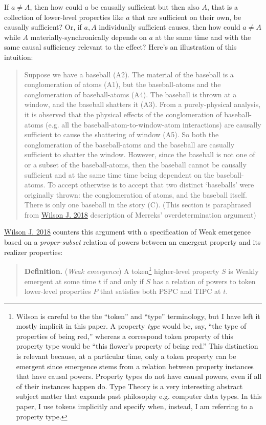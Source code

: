 \documentclass{article}
\newcommand{\ti}[1]{\textit{#1}}
\newcommand{\tb}[1]{\textbf{#1}}
\renewcommand{\cite}[1]{\hyperlink{#1}{#1}}
\begin{document}
If $a \neq A$, then how could $a$ be causally sufficient but then also $A$, that is a collection of lower-level properties like $a$ that are sufficient on their own, be causally sufficient? Or, if $a, A$ individually sufficient causes, then how could $a \neq A$ while $A$ materially-synchronically depends on $a$ at the same time and with the same causal sufficiency relevant to the effect? Here's an illustration of this intuition:

\begin{quote}
    Suppose we have a baseball (A2). The material of the baseball is a conglomeration of atoms (A1), but the baseball-atoms and the conglomeration of baseball-atoms (A4). The baseball is thrown at a window, and the baseball shatters it (A3). From a purely-physical analysis, it is observed that the physical effects of the conglomeration of baseball-atoms (e.g. all the baseball-atom-to-window-atom interactions) are causally sufficient to cause the shattering of window (A5). So both the conglomeration of the baseball-atoms and the baseball are casually sufficient to shatter the window. However, since the baseball is not one of or a subset of the baseball-atoms, then the baseball cannot be causally sufficient and at the same time time being dependent on the baseball-atoms. To accept otherwise is to accept that two distinct `baseballs' were originally thrown: the conglomeration of atoms, and the baseball itself. There is only one baseball in the story (C). (This section is paraphrased from \cite{Wilson J. 2018} description of Merreks' overdetermination argument)
\end{quote}

\cite{Wilson J. 2018} counters this argument with a specification of Weak emergence based on a \ti{proper-subset} relation of powers between an emergent property and its realizer properties:

\begin{quote}
\tb{Definition.} (\ti{Weak emergence}) A token\footnote{Wilson is careful to the the ``token'' and ``type'' terminology, but I have left it mostly implicit in this paper. A property \ti{type} would be, say, ``the type of properties of being red,'' whereas a correspond token property of this property type would be ``this flower's property of being red.'' This distinction is relevant because, at a particular time, only a token property can be emergent since emergence stems from a relation between property instances that have causal powers. Property types do not have causal powers, even if all of their instances happen do. Type Theory is a very interesting abstract subject matter that expands past philosophy e.g. computer data types. In this paper, I use tokens implicitly and specify when, instead, I am referring to a property type.} higher-level property $S$ is Weakly emergent at some time $t$ if and only if $S$ has a relation of powers to token lower-level properties $P$ that satisfies both PSPC and TIPC at $t$.
\end{quote}
\end{document}
